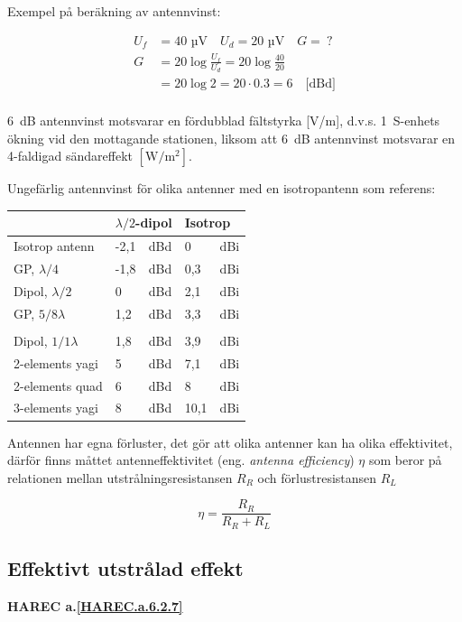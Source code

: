 Exempel på beräkning av antennvinst:

\begin{align*}
  U_f &= 40\text{ µV} \quad U_d = 20\text{ µV} \quad G =\ ? \\
  G &= 20 \log\frac{U_f}{U_d} = 20 \log\frac{40}{20} \\
  &= 20 \log 2 = 20\cdot 0.3 = 6 \quad \text{[dBd]} \\
\end{align*}

6~dB antennvinst motsvarar en fördubblad fältstyrka [V/m], d.v.s. 1~S-enhets
ökning vid den mottagande stationen, liksom att 6~dB antennvinst motsvarar
en 4-faldigad sändareffekt \(\mathrm{[W/m^2]}\).

Ungefärlig antennvinst för olika antenner med en isotropantenn som referens:
\begin{tabular}{l|ll|ll}
  & \multicolumn{2}{l|}{\(\lambda/2\)-dipol} &
  \multicolumn{2}{l}{Isotrop} \\
  \hline
  Isotrop antenn       & -2,1 & dBd & 0   & dBi \\
  GP, \(\lambda/4\)    & -1,8 & dBd & 0,3 & dBi \\
  Dipol, \(\lambda/2\) & 0    & dBd & 2,1 & dBi \\
  GP, \(5/8\lambda\)   & 1,2  & dBd & 3,3 & dBi \\
  & & & & \\
  Dipol, \(1/1\lambda\) & 1,8 & dBd & 3,9  & dBi \\
  2-elements yagi       & 5   & dBd & 7,1  & dBi \\
  2-elements quad       & 6   & dBd & 8    & dBi \\
  3-elements yagi       & 8   & dBd & 10,1 & dBi \\
\end{tabular}

Antennen har egna förluster, det gör att olika antenner kan ha olika
effektivitet, därför finns måttet antenneffektivitet
(eng. \emph{antenna efficiency}) \(\eta\) som beror på relationen mellan
utstrålningsresistansen \(R_R\) och förlustresistansen \(R_L\)

\[\eta = \frac{R_R}{R_R+R_L}\]

\subsection{Effektivt utstrålad effekt}
\textbf{
HAREC a.\ref{HAREC.a.6.2.7}\label{myHAREC.a.6.2.7}
}

